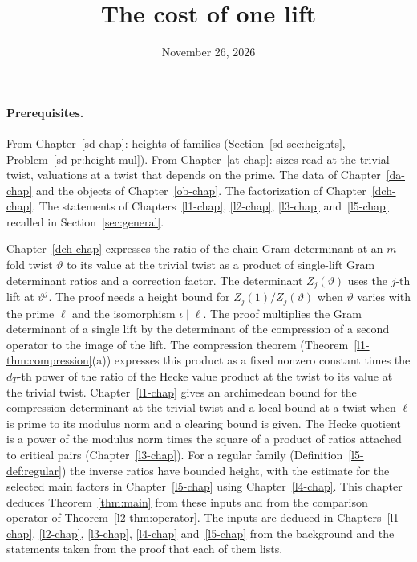 \documentclass[reqno]{amsart}
\title{The cost of one lift}
\author{}
\date{November 26, 2026}
\newcounter{chap}
\theoremstyle{definition}
\theoremstyle{plain}
\begin{document}
\maketitle
{}\label{chap}

\paragraph{Prerequisites.}
From Chapter~\ref{sd-chap}: heights of families (Section~\ref{sd-sec:heights}, Problem~\ref{sd-pr:height-mul}).  From Chapter~\ref{at-chap}: sizes read at the trivial twist, valuations at a twist that depends on the prime.  The data of Chapter~\ref{da-chap} and the objects of Chapter~\ref{ob-chap}.  The factorization of Chapter~\ref{dch-chap}.  The statements of Chapters~\ref{l1-chap}, \ref{l2-chap}, \ref{l3-chap} and~\ref{l5-chap} recalled in Section~\ref{sec:general}.

\medskip
Chapter~\ref{dch-chap} expresses the ratio of the chain Gram determinant at an \(m\)-fold twist \(\vartheta\) to its value at the trivial twist as a product of single-lift Gram determinant ratios and a correction factor.  The determinant \(Z_j(\vartheta)\) uses the \(j\)-th lift at \(\vartheta^j\).  The proof needs a height bound for \(Z_j(1)/Z_j(\vartheta)\) when \(\vartheta\) varies with the prime \(\ell\) and the isomorphism \(\iota \mid \ell\).  The proof multiplies the Gram determinant of a single lift by the determinant of the compression of a second operator to the image of the lift.  The compression theorem (Theorem~\ref{l1-thm:compression}(a)) expresses this product as a fixed nonzero constant times the \(d_T\)-th power of the ratio of the Hecke value product at the twist to its value at the trivial twist.  Chapter~\ref{l1-chap} gives an archimedean bound for the compression determinant at the trivial twist and a local bound at a twist when \(\ell\) is prime to its modulus norm and a clearing bound is given.  The Hecke quotient is a power of the modulus norm times the square of a product of ratios attached to critical pairs (Chapter~\ref{l3-chap}).  For a regular family (Definition~\ref{l5-def:regular}) the inverse ratios have bounded height, with the estimate for the selected main factors in Chapter~\ref{l5-chap} using Chapter~\ref{l4-chap}.  This chapter deduces Theorem~\ref{thm:main} from these inputs and from the comparison operator of Theorem~\ref{l2-thm:operator}.  The inputs are deduced in Chapters~\ref{l1-chap}, \ref{l2-chap}, \ref{l3-chap}, \ref{l4-chap} and~\ref{l5-chap} from the background and the statements taken from the proof that each of them lists.
\end{document}
